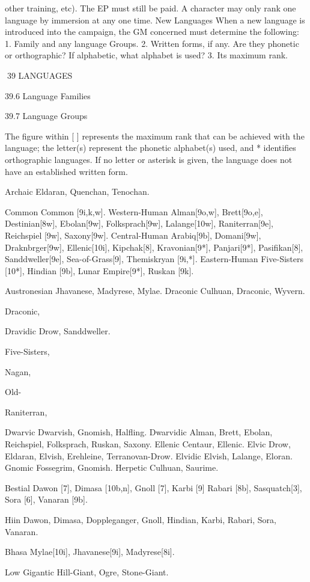 \documentclass[a4paper]{article}
\begin{document}
\begin{multicols}{3}
other training, etc). The EP must still be paid. A
character may only rank one language by immersion at any one time.
New Languages When a new language is introduced into the campaign, the GM concerned must
determine the following:
1. Family and any language Groups.
2. Written forms, if any. Are they phonetic or
orthographic? If alphabetic, what alphabet is used?
3. Its maximum rank.

39 LANGUAGES

39.6 Language Families

39.7 Language Groups

The figure within [ ] represents the maximum rank
that can be achieved with the language; the letter(s)
represent the phonetic alphabet(s) used, and *
identifies orthographic languages. If no letter or
asterisk is given, the language does not have an
established written form.

Archaic Eldaran, Quenchan, Tenochan.

Common Common [9i,k,w].
Western-Human Alman[9o,w], Brett[9o,e], Destinian[8w], Ebolan[9w], Folksprach[9w], Lalange[10w], Raniterran[9e], Reichspiel [9w],
Saxony[9w].
Central-Human
Arabiq[9b],
Domani[9w],
Draknbrger[9w], Ellenic[10i], Kipchak[8], Kravonian[9*],
Panjari[9*],
Pasifikan[8],
Sanddweller[9e], Sea-of-Grass[9], Themiskryan
[9i,*].
Eastern-Human Five-Sisters [10*], Hindian [9b],
Lunar Empire[9*], Ruskan [9k].

Austronesian Jhavanese, Madyrese, Mylae.
Draconic Culhuan,
Draconic, Wyvern.

Draconic,

Dravidic
Drow,
Sanddweller.

Five-Sisters,

Nagan,

Old-

Raniterran,

Dwarvic Dwarvish, Gnomish, Halfling.
Dwarvidic Alman, Brett, Ebolan, Reichspiel,
Folksprach, Ruskan, Saxony.
Ellenic Centaur, Ellenic.
Elvic Drow, Eldaran, Elvish, Erehleine, Terranovan-Drow.
Elvidic Elvish, Lalange, Eloran.
Gnomic Fossegrim, Gnomish.
Herpetic Culhuan, Saurime.

Bestial Dawon [7], Dimasa [10b,n], Gnoll [7],
Karbi [9] Rabari [8b], Sasquatch[3], Sora [6],
Vanaran [9b].

Hiin Dawon, Dimasa, Doppleganger, Gnoll, Hindian, Karbi, Rabari, Sora, Vanaran.

Bhasa Mylae[10i], Jhavanese[9i], Madyrese[8i].

Low Gigantic Hill-Giant, Ogre, Stone-Giant.


\end{multicols}
\end{document}
